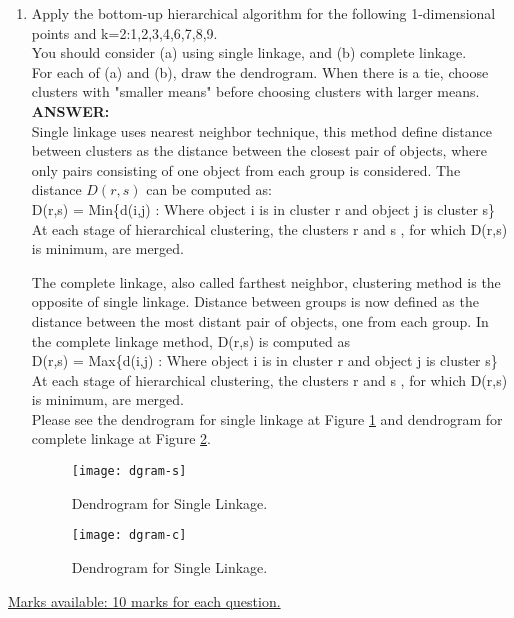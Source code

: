 \documentclass{article}
\begin{document}
\begin{enumerate}
\item Apply the bottom-up hierarchical algorithm for the following
  1-dimensional points and k=2:1,2,3,4,6,7,8,9.\\
  You should consider (a) using single linkage, and (b) complete
  linkage.\\ 
  For each of (a) and (b), draw the dendrogram. When there is a tie,
  choose clusters with "smaller means" before choosing clusters with
  larger means. \\
\textbf{ANSWER:} \\
Single linkage uses nearest neighbor technique, this method define
distance between clusters as the distance between the closest pair of
objects, where only pairs consisting of one object from each group is
considered. The distance $D(r,s)$ can be computed as: \\

D(r,s) = Min\{d(i,j) : Where object i is in cluster r and object j is
 cluster s\} \\

At each stage of hierarchical clustering, the clusters r and s , for
which D(r,s) is minimum, are merged.

The complete linkage, also called farthest neighbor, clustering method
is the opposite of single linkage.  Distance between groups is now
defined as the distance between the most distant pair of objects, one
from each group. 
In the complete linkage method, D(r,s) is computed as \\

D(r,s) = Max\{d(i,j) : Where object i is in cluster r and object j is
 cluster s\} \\

At each stage of hierarchical clustering, the clusters r and s , for
which D(r,s) is minimum, are merged. \\
Please see the dendrogram for single linkage at Figure
\ref{fig:dgram-s} and dendrogram for complete linkage at Figure
\ref{fig:dgram-c}. 

\begin{figure}[H]
  \vspace{-10pt}
  \begin{center}
    \texttt{[image: dgram-s]}
    \caption{Dendrogram for Single Linkage.\label{fig:dgram-s}}
  \end{center}
  \vspace{-20pt}
\end{figure}

\begin{figure}[H]
  \vspace{-10pt}
  \begin{center}
    \texttt{[image: dgram-c]}
    \caption{Dendrogram for Single Linkage.\label{fig:dgram-c}}
  \end{center}
  \vspace{-20pt}
\end{figure}

\end{enumerate} %

\underline{Marks available: 10 marks for each question.}
\end{document}
